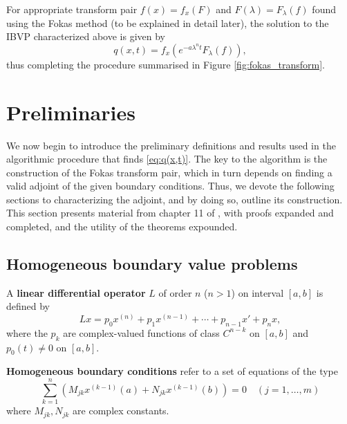\documentclass[12pt, oneside, a4paper]{article}
\begin{document}
For appropriate transform pair $f(x)=f_x(F)$ and $F(\lambda)=F_\lambda(f)$ found using the Fokas method (to be explained in detail later), the solution to the IBVP characterized above is given by \cite[p.15]{Smith2016}
\begin{equation}\label{eq:q(x,t)}
    q(x,t) = f_x(e^{-a\lambda^n t}F_\lambda(f)),
\end{equation}
thus completing the procedure summarised in Figure \ref{fig:fokas_transform}.

\section{Preliminaries}
We now begin to introduce the preliminary definitions and results used in the algorithmic procedure that finds \eqref{eq:q(x,t)}. The key to the algorithm is the construction of the Fokas transform pair, which in turn depends on finding a valid adjoint of the given boundary conditions. Thus, we devote the following sections to characterizing the adjoint, and by doing so, outline its construction. This section presents material from chapter 11 of \cite{CoddingtonLevinson}, with proofs expanded and completed, and the utility of the theorems expounded.

\subsection{Homogeneous boundary value problems}
\begin{defn}\cite[p.81]{CoddingtonLevinson}\label{defn:linear differential operator}
    A \textbf{linear differential operator} $L$ of order $n$ ($n>1$) on interval $[a,b]$ is defined by
    \begin{equation}\label{eq:L}
        Lx = p_0x^{(n)} + p_1x^{(n-1)} + \cdots + p_{n-1}x' + p_nx,
    \end{equation}
    where the $p_k$ are complex-valued functions of class $C^{n-k}$ on $[a,b]$ and $p_0(t)\neq 0$ on $[a,b]$.
\end{defn}

\begin{defn}\cite[p.284]{CoddingtonLevinson}\label{defn:homogeneous boundary conditions}
    \textbf{Homogeneous boundary conditions} refer to a set of equations of the type
    \begin{equation}\label{eq:homogeneous boundary conditions}
        \sum_{k=1}^n (M_{jk}x^{(k-1)}(a) + N_{jk}x^{(k-1)}(b))=0 \quad (j=1,\ldots,m) 
    \end{equation}
    where $M_{jk}, N_{jk}$ are complex constants.
\end{defn}
\end{document}
